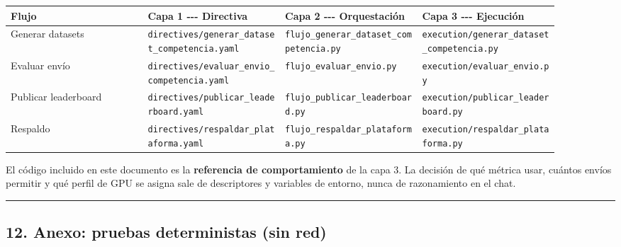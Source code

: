 \documentclass[11pt,a4paper]{article}
\begin{document}
\begin{longtable}[]{@{}p{0.225\linewidth}p{0.225\linewidth}p{0.225\linewidth}p{0.225\linewidth}@{}}
\toprule
Flujo & Capa 1 -\/-\/- Directiva & Capa 2 -\/-\/- Orquestación & Capa 3 -\/-\/- Ejecución \\
\midrule
\endhead
Generar datasets & \texttt{directives/\allowbreak{}generar\_\allowbreak{}dataset\_\allowbreak{}competencia.\allowbreak{}yaml} & \texttt{flujo\_\allowbreak{}generar\_\allowbreak{}dataset\_\allowbreak{}competencia.\allowbreak{}py} & \texttt{execution/\allowbreak{}generar\_\allowbreak{}dataset\_\allowbreak{}competencia.\allowbreak{}py} \\
Evaluar envío & \texttt{directives/\allowbreak{}evaluar\_\allowbreak{}envio\_\allowbreak{}competencia.\allowbreak{}yaml} & \texttt{flujo\_\allowbreak{}evaluar\_\allowbreak{}envio.\allowbreak{}py} & \texttt{execution/\allowbreak{}evaluar\_\allowbreak{}envio.\allowbreak{}py} \\
Publicar leaderboard & \texttt{directives/\allowbreak{}publicar\_\allowbreak{}leaderboard.\allowbreak{}yaml} & \texttt{flujo\_\allowbreak{}publicar\_\allowbreak{}leaderboard.\allowbreak{}py} & \texttt{execution/\allowbreak{}publicar\_\allowbreak{}leaderboard.\allowbreak{}py} \\
Respaldo & \texttt{directives/\allowbreak{}respaldar\_\allowbreak{}plataforma.\allowbreak{}yaml} & \texttt{flujo\_\allowbreak{}respaldar\_\allowbreak{}plataforma.\allowbreak{}py} & \texttt{execution/\allowbreak{}respaldar\_\allowbreak{}plataforma.\allowbreak{}py} \\
\bottomrule
\end{longtable}

El código incluido en este documento es la \textbf{referencia de comportamiento} de la capa 3. La decisión de qué métrica usar, cuántos envíos permitir y qué perfil de GPU se asigna sale de descriptores y variables de entorno, nunca de razonamiento en el chat.

\begin{center}\rule{0.5\linewidth}{0.5pt}\end{center}

\hypertarget{12-anexo-pruebas-deterministas-sin-red}{%
\subsection{12. Anexo: pruebas deterministas (sin red)}\label{12-anexo-pruebas-deterministas-sin-red}}
\end{document}
